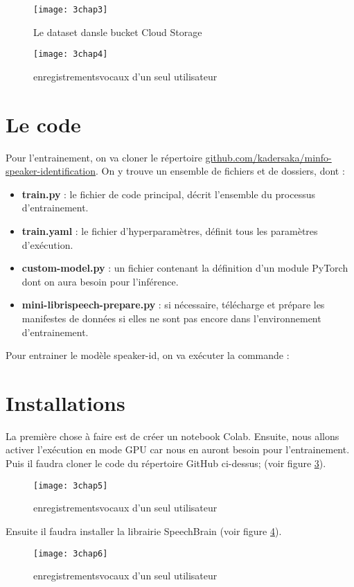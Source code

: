 \begin{figure}[h]
    \centering
    \texttt{[image: 3chap3]}
    \caption{Le dataset dansle bucket Cloud Storage}
    \label{fig:3chap3}
\end{figure}


\begin{figure}[h]
    \centering
    \texttt{[image: 3chap4]}
    \caption{enregistrementsvocaux d'un seul utilisateur}
    \label{fig:3chap4}
\end{figure}

\section{Le code}
Pour l’entrainement, on va cloner le répertoire  \href{ https://github.com/kadersaka/minfo_speaker_identification}{github.com/kadersaka/minfo-speaker-identification}. On y trouve un ensemble de fichiers et de dossiers, dont :

\begin{itemize}
    \item \textbf{train.py }: le fichier de code principal, décrit l'ensemble du processus d’entrainement.
    \item \textbf{train.yaml }: le fichier d'hyperparamètres, définit tous les paramètres d'exécution.
	\item \textbf{custom-model.py } : un fichier contenant la définition d'un module PyTorch dont on aura besoin pour l’inférence.
	\item \textbf{mini-librispeech-prepare.py} : si nécessaire, télécharge et prépare les manifestes de données si elles ne sont pas encore dans l’environnement d’entrainement.
\end{itemize}
Pour entrainer le modèle speaker-id, on va exécuter la commande :

\section{Installations}
La première chose à faire est de créer un notebook Colab.  Ensuite, nous allons activer l’exécution en mode GPU car nous en auront besoin pour l’entrainement. Puis il faudra cloner le code du répertoire GitHub ci-dessus; (voir figure \ref{fig:3chap5}).
\begin{figure}[h]
    \centering
    \texttt{[image: 3chap5]}
    \caption{enregistrementsvocaux d'un seul utilisateur}
    \label{fig:3chap5}
\end{figure}
Ensuite il faudra installer la librairie SpeechBrain (voir figure \ref{fig:3chap6}).
\begin{figure}[h]
    \centering
    \texttt{[image: 3chap6]}
    \caption{enregistrementsvocaux d'un seul utilisateur}
    \label{fig:3chap6}
\end{figure}

